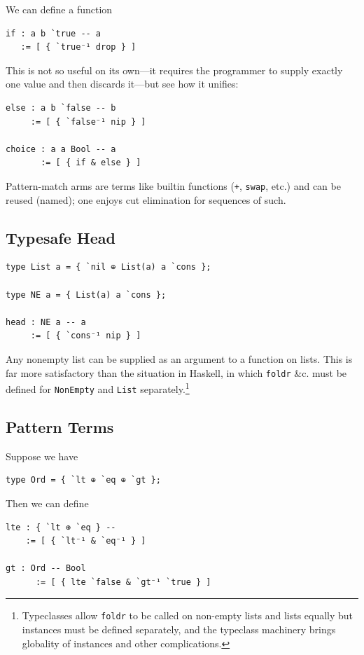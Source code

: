 \documentclass{article}
\begin{document}
We can define a function

\begin{verbatim}
if : a b `true -- a
   := [ { `true⁻¹ drop } ]
\end{verbatim}

This is not so useful on its own---it requires the programmer to supply exactly one value and then discards it---but see how it unifies:

\begin{verbatim}
else : a b `false -- b
     := [ { `false⁻¹ nip } ]

choice : a a Bool -- a
       := [ { if & else } ]
\end{verbatim}

Pattern-match arms are terms like builtin functions (\verb|+|, \verb|swap|, etc.) and can be reused (named); one enjoys cut elimination for sequences of such.

\subsection{Typesafe Head}\label{sec:head}

\begin{verbatim}
type List a = { `nil ⊕ List(a) a `cons };

type NE a = { List(a) a `cons };

head : NE a -- a
     := [ { `cons⁻¹ nip } ]
\end{verbatim}

Any nonempty list can be supplied as an argument to a function on lists. This is far more satisfactory than the situation in Haskell, in which \verb|foldr| \&c. must be defined for \verb|NonEmpty| and \verb|List| separately.\footnote{Typeclasses allow \verb|foldr| to be called on non-empty lists and lists equally but instances must be defined separately, and the typeclass machinery brings globality of instances and other complications.}

\subsection{Pattern Terms}

Suppose we have

\begin{verbatim}
type Ord = { `lt ⊕ `eq ⊕ `gt };
\end{verbatim}

Then we can define

\begin{verbatim}
lte : { `lt ⊕ `eq } --
    := [ { `lt⁻¹ & `eq⁻¹ } ]

gt : Ord -- Bool
      := [ { lte `false & `gt⁻¹ `true } ]
\end{verbatim}
\end{document}

